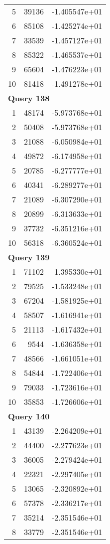 \begin{longtable}[{p}]{@{}rrp{}@{}}
5 & 39136 & -1.405547e+01 \\
6 & 85108 & -1.425274e+01 \\
7 & 33539 & -1.457127e+01 \\
8 & 85322 & -1.465537e+01 \\
9 & 65604 & -1.476223e+01 \\
10 & 81418 & -1.491278e+01 \\
\midrule
\multicolumn{3}{l}{\bfseries Query 138} \\
1 & 48174 & -5.973768e+01 \\
2 & 50408 & -5.973768e+01 \\
3 & 21088 & -6.050984e+01 \\
4 & 49872 & -6.174958e+01 \\
5 & 20785 & -6.277777e+01 \\
6 & 40341 & -6.289277e+01 \\
7 & 21089 & -6.307290e+01 \\
8 & 20899 & -6.313633e+01 \\
9 & 37732 & -6.351216e+01 \\
10 & 56318 & -6.360524e+01 \\
\midrule
\multicolumn{3}{l}{\bfseries Query 139} \\
1 & 71102 & -1.395330e+01 \\
2 & 79525 & -1.533248e+01 \\
3 & 67204 & -1.581925e+01 \\
4 & 58507 & -1.616941e+01 \\
5 & 21113 & -1.617432e+01 \\
6 & 9544 & -1.636358e+01 \\
7 & 48566 & -1.661051e+01 \\
8 & 54844 & -1.722406e+01 \\
9 & 79033 & -1.723616e+01 \\
10 & 35853 & -1.726606e+01 \\
\midrule
\multicolumn{3}{l}{\bfseries Query 140} \\
1 & 43139 & -2.264209e+01 \\
2 & 44400 & -2.277623e+01 \\
3 & 36005 & -2.279424e+01 \\
4 & 22321 & -2.297405e+01 \\
5 & 13065 & -2.320892e+01 \\
6 & 57378 & -2.336217e+01 \\
7 & 35214 & -2.351546e+01 \\
8 & 33779 & -2.351546e+01 \\

\end{longtable}
